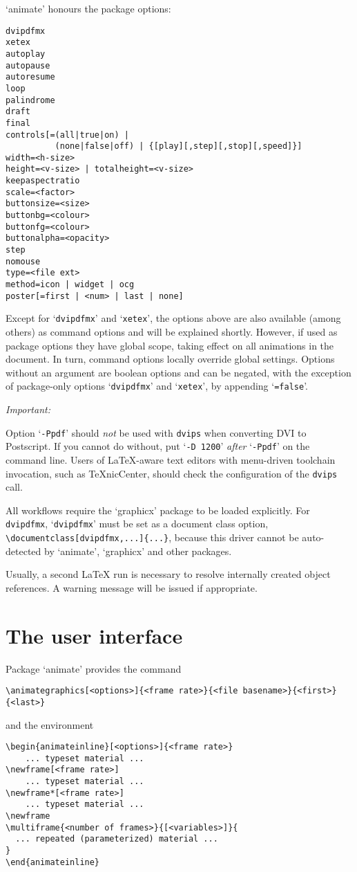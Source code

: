\documentclass[a4paper]{article}
\begin{document}
`animate' honours the package options:
\begin{verbatim}
dvipdfmx
xetex
autoplay
autopause
autoresume
loop
palindrome
draft
final
controls[=(all|true|on) |
          (none|false|off) | {[play][,step][,stop][,speed]}]
width=<h-size>
height=<v-size> | totalheight=<v-size>
keepaspectratio
scale=<factor>
buttonsize=<size>
buttonbg=<colour>
buttonfg=<colour>
buttonalpha=<opacity>
step
nomouse
type=<file ext>
method=icon | widget | ocg
poster[=first | <num> | last | none]
\end{verbatim}
Except for `\verb+dvipdfmx+' and `\verb+xetex+', the options above are also available (among others) as command options and will be explained shortly. However, if used as package options they have global scope, taking effect on all animations in the document. In turn, command options locally override global settings. Options without an argument are boolean options and can be negated, with the exception of package-only options `\verb+dvipdfmx+' and `\verb+xetex+', by appending `\verb+=false+'.

\begin{animateinline}{1}\strut\emph{Important:}\newframe[3]\end{animateinline} Option `\verb+-Ppdf+' should \emph{not} be used with \verb+dvips+ when converting DVI to Postscript. If you cannot do without, put `\verb+-D 1200+' \emph{after} `\verb+-Ppdf+' on the command line. Users of \LaTeX-aware text editors with menu-driven toolchain invocation, such as \TeX{}nicCenter, should check the configuration of the \verb+dvips+ call.

All workflows require the `graphicx' package to be loaded explicitly. For \verb+dvipdfmx+, `\verb+dvipdfmx+' must be set as a document class option, \verb+\documentclass[dvipdfmx,...]{...}+, because this driver cannot be auto-detected by `animate', `graphicx' and other packages.

Usually, a second \LaTeX{} run is necessary to resolve internally created object references. A warning message will be issued if appropriate.

\section{The user interface}
Package `animate' provides the command
\begin{verbatim}
\animategraphics[<options>]{<frame rate>}{<file basename>}{<first>}{<last>}
\end{verbatim}
and the environment
\begin{verbatim}
\begin{animateinline}[<options>]{<frame rate>}
    ... typeset material ...
\newframe[<frame rate>]
    ... typeset material ...
\newframe*[<frame rate>]
    ... typeset material ...
\newframe
\multiframe{<number of frames>}{[<variables>]}{
  ... repeated (parameterized) material ...
}
\end{animateinline}
\end{verbatim}
\end{document}
